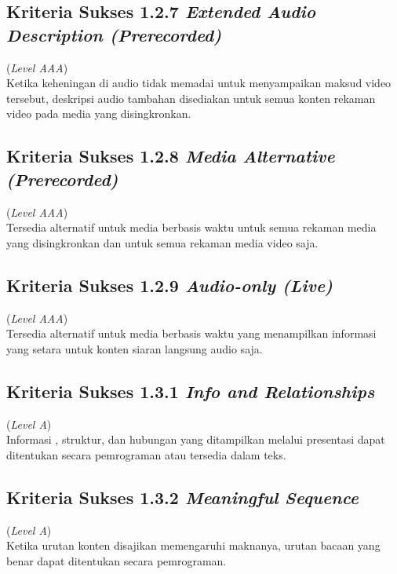 \subsection{Kriteria Sukses 1.2.7 \textit{Extended Audio Description (Prerecorded)}}
\label{subsec:kriteria_1.2.7}
(\textit{Level AAA}) \\

Ketika keheningan di audio tidak memadai untuk menyampaikan maksud video tersebut, deskripsi audio tambahan disediakan untuk semua konten rekaman video pada media yang disingkronkan. 


\subsection{Kriteria Sukses 1.2.8 \textit{Media Alternative (Prerecorded)}}
\label{subsec:kriteria_1.2.8}
(\textit{Level AAA}) \\

Tersedia alternatif untuk media berbasis waktu untuk semua rekaman media yang disingkronkan dan untuk semua rekaman media video saja.

\subsection{Kriteria Sukses 1.2.9 \textit{Audio-only (Live)}}
\label{subsec:kriteria_1.2.9}
(\textit{Level AAA}) \\

Tersedia alternatif untuk media berbasis waktu yang menampilkan informasi yang setara untuk konten siaran langsung audio saja.


\subsection{Kriteria Sukses 1.3.1 \textit{Info and Relationships}}
\label{subsec:kriteria_1.3.1}
(\textit{Level A}) \\

Informasi , struktur, dan hubungan yang ditampilkan melalui presentasi dapat ditentukan secara pemrograman atau tersedia dalam teks.


\subsection{Kriteria Sukses 1.3.2 \textit{Meaningful Sequence}}
\label{subsec:kriteria_1.3.2}
(\textit{Level A}) \\

Ketika urutan konten disajikan memengaruhi maknanya, urutan bacaan yang benar dapat ditentukan secara pemrograman.


